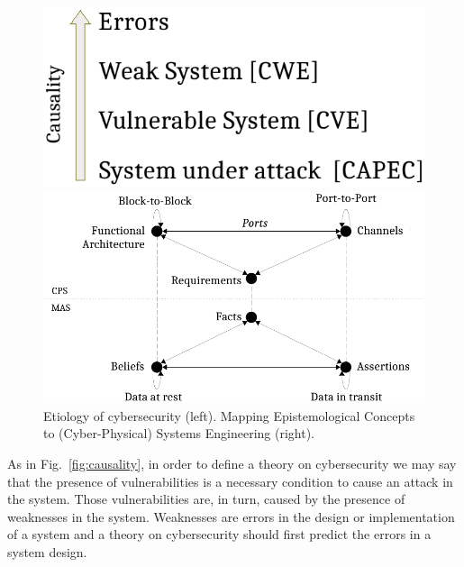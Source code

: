 \documentclass[runningheads]{llncs}
\begin{document}
\begin{figure}[t]
\begin{minipage}[t]{0.4\textwidth}
	\includegraphics[width=\columnwidth]{causality.pdf}
\end{minipage}
\begin{minipage}[t]{0.6\textwidth}
	\includegraphics[width=.9\columnwidth]{abftheory.pdf}
\end{minipage}
  \caption{Etiology of cybersecurity (left). Mapping Epistemological Concepts to (Cyber-Physical) Systems Engineering (right).}
	\label{fig:causality}
	\label{fig:mashyp}
\end{figure}

As in Fig.~\ref{fig:causality}, in order to define a theory on cybersecurity we may
say that the presence of vulnerabilities is a necessary condition to
cause an attack in the system.  Those vulnerabilities are, in turn, caused by
the presence of weaknesses in the system.  Weaknesses are errors in the design
or implementation of a system and a theory on cybersecurity should
first predict the errors in a system design.
\end{document}

